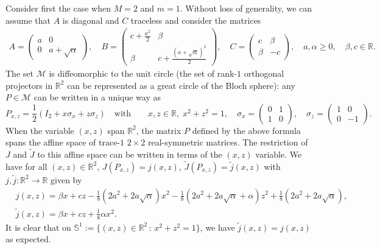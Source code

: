 \documentclass{article}
\def\R{\mathbb R}
\newcommand{\1}{{\mathds 1}}
\begin{document}
\noindent
Consider first the case when $M=2$ and $m=1$. Without loss of generality, we can assume that $A$ is diagonal and $C$ traceless and consider the matrices 
\begin{align*}
    A = \begin{pmatrix}
        a & 0 \\ 0 & a+\sqrt\alpha
    \end{pmatrix}, \quad B = \begin{pmatrix}
        c+\frac{a^2}2 & \beta \\ \beta & c+\frac{(a+\sqrt \alpha)^2}2 
    \end{pmatrix}, \quad C = \begin{pmatrix}
        c & \beta \\ \beta & -c
    \end{pmatrix}, \quad a, \alpha \ge 0, \quad \beta,c \in \R.
\end{align*}
The set $\mathcal M$ is diffeomorphic to the unit circle (the set of rank-$1$ orthogonal projectors in $\R^2$ can be represented as a great circle of the Bloch sphere): any $P \in \mathcal M$ can be written in a unique way as 
$$
P_{x,z} = \frac 12 \left( I_2 + x \sigma_x + z \sigma_z \right) \quad \mbox{with} \qquad x,z \in \R, \; x^2+z^2=1, \quad \sigma_x=\begin{pmatrix} 0 & 1 \\ 1 & 0 \end{pmatrix}, \quad 
\sigma_z=\begin{pmatrix} 1 & 0 \\ 0 & -1 \end{pmatrix}.
$$
When the variable $(x,z)$ span $\R^2$, the matrix $P$ defined by the above formula spans the affine space of trace-$1$ $2 \times 2$ real-symmetric matrices. The restriction of $J$ and $\widetilde J$ to this affine space can be written in terms of the $(x,z)$ variable. We have for all $(x,z) \in \R^2$, $J(P_{x,z})=j(x,z)$, $\widetilde J(P_{x,z})=\widetilde j(x,z)$ with $j,\widetilde j: \R^2 \to \R$ given by 
\begin{align*}
& j(x,z) = \beta x + c z - \frac 18 (2 a^2+2a\sqrt \alpha) x^2  - \frac 18 (2 a^2+2a\sqrt \alpha + \alpha) z^2 + \frac 18 (2 a^2+2a\sqrt \alpha) , \\
    &\widetilde j(x,z) = \beta x + c z + \frac 18 \alpha x^2.
\end{align*}
It is clear that on $\mathbb S^1:=\{(x,z) \in \R^2 \, : \, x^2+z^2=1\}$, we have $\widetilde j(x,z)=j(x,z)$ as expected.

\medskip
\end{document}
